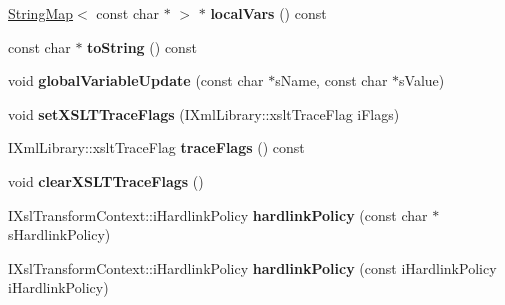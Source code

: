 \begin{DoxyCompactItemize}
\item 
\hypertarget{classgeneral__server_1_1LibXslTransformContext_a3e1d4e42cb98035536f153143999403b}{\hyperlink{classgeneral__server_1_1StringMap}{\-String\-Map}$<$ const char $\ast$ $>$ $\ast$ {\bfseries local\-Vars} () const }\label{classgeneral__server_1_1LibXslTransformContext_a3e1d4e42cb98035536f153143999403b}

\item 
\hypertarget{classgeneral__server_1_1LibXslTransformContext_a29ead55873a9f30202c551f7b6a87ec9}{const char $\ast$ {\bfseries to\-String} () const }\label{classgeneral__server_1_1LibXslTransformContext_a29ead55873a9f30202c551f7b6a87ec9}

\item 
\hypertarget{classgeneral__server_1_1LibXslTransformContext_ae2ad0cd493bcb38fa2fe99964be77f52}{void {\bfseries global\-Variable\-Update} (const char $\ast$s\-Name, const char $\ast$s\-Value)}\label{classgeneral__server_1_1LibXslTransformContext_ae2ad0cd493bcb38fa2fe99964be77f52}

\item 
\hypertarget{classgeneral__server_1_1LibXslTransformContext_a3fd4d8da3b1b1b4de1e2d043f5123f43}{void {\bfseries set\-X\-S\-L\-T\-Trace\-Flags} (\-I\-Xml\-Library\-::xslt\-Trace\-Flag i\-Flags)}\label{classgeneral__server_1_1LibXslTransformContext_a3fd4d8da3b1b1b4de1e2d043f5123f43}

\item 
\hypertarget{classgeneral__server_1_1LibXslTransformContext_a3b9cfc6847a80f04bfa8f30a617d0bef}{\-I\-Xml\-Library\-::xslt\-Trace\-Flag {\bfseries trace\-Flags} () const }\label{classgeneral__server_1_1LibXslTransformContext_a3b9cfc6847a80f04bfa8f30a617d0bef}

\item 
\hypertarget{classgeneral__server_1_1LibXslTransformContext_a70a2d63be57273961dd9359bf5710141}{void {\bfseries clear\-X\-S\-L\-T\-Trace\-Flags} ()}\label{classgeneral__server_1_1LibXslTransformContext_a70a2d63be57273961dd9359bf5710141}

\item 
\hypertarget{classgeneral__server_1_1LibXslTransformContext_ad9d828830c9ae31a1ef13a58c7b7cc83}{\-I\-Xsl\-Transform\-Context\-::i\-Hardlink\-Policy {\bfseries hardlink\-Policy} (const char $\ast$s\-Hardlink\-Policy)}\label{classgeneral__server_1_1LibXslTransformContext_ad9d828830c9ae31a1ef13a58c7b7cc83}

\item 
\hypertarget{classgeneral__server_1_1LibXslTransformContext_ab63625746cc203f86770300e723967cc}{\-I\-Xsl\-Transform\-Context\-::i\-Hardlink\-Policy {\bfseries hardlink\-Policy} (const i\-Hardlink\-Policy i\-Hardlink\-Policy)}\label{classgeneral__server_1_1LibXslTransformContext_ab63625746cc203f86770300e723967cc}


\end{DoxyCompactItemize}
